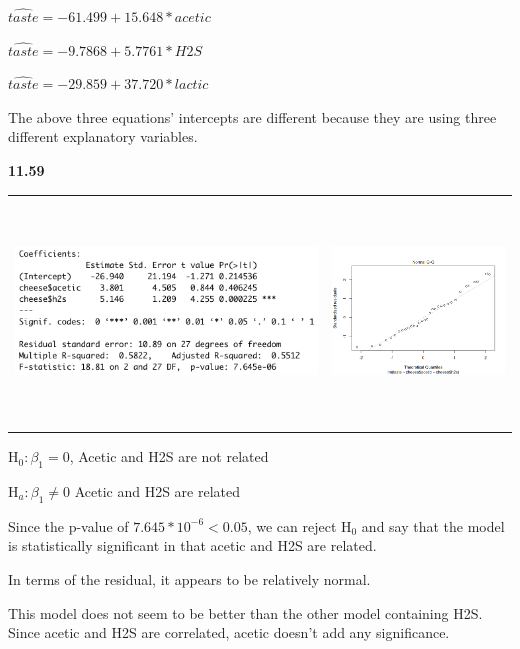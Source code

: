 \documentclass[12pt]{article}
\renewcommand\part[1]{\vspace{.10in}\textbf{#1}\par}
\begin{document}
	$\hat{taste} = -61.499 + 15.648*acetic$\par
	$\hat{taste} = -9.7868 + 5.7761 * H2S$\par
	$\hat{taste} = -29.859 + 37.720 * lactic$\par
	
	The above three equations' intercepts are different because they are using three different explanatory variables.\par

\part{11.59}
	
	\begin{center}
	\begin{tabular}{cc}
		\includegraphics[width=.5\textwidth, height=60mm, keepaspectratio]{images/1159/1159summary.png} & \includegraphics[width=.5\textwidth, height=60mm, keepaspectratio]{images/1159/1159qqplot.png}\\
	\end{tabular}
	\end{center}\par
	H$_{0}: \beta_{1} = 0$, Acetic and H2S are not related\par
	H$_{a}: \beta_{1} \ne 0$ Acetic and H2S are related\par
	Since the p-value of $7.645*10^{-6} < 0.05$, we can reject H$_{0}$ and say that the model is statistically significant in that acetic and H2S are related.\par
	In terms of the residual, it appears to be relatively normal.\par
	This model does not seem to be better than the other model containing H2S. Since acetic and H2S are correlated, acetic doesn't add any significance.\par
\end{document}
